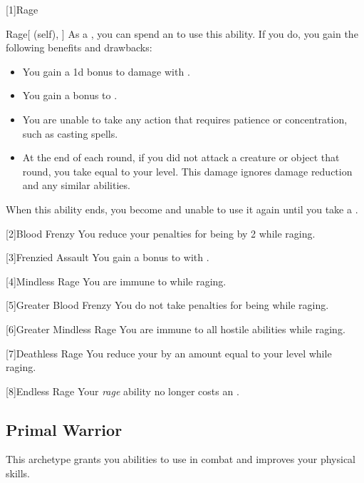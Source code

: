         [1]{Rage}
        \begin{ability}{Rage}[ (self), ]
            As a , you can spend an  to use this ability.
            If you do, you gain the following benefits and drawbacks:
            \begin{itemize}
                \item You gain a \plus1d bonus to damage with .
                \item You gain a  bonus to .
                \item You are unable to take any action that requires patience or concentration, such as casting spells.
                \item At the end of each round, if you did not attack a creature or object that round, you take  equal to your level.
                    This damage ignores damage reduction and any similar abilities.
            \end{itemize}
            When this ability ends, you become \fatigued and unable to use it again until you take a .
        \end{ability}

        [2]{Blood Frenzy}
        You reduce your penalties for being  by 2 while raging.

        [3]{Frenzied Assault}
        You gain a  bonus to  with .

        [4]{Mindless Rage}
        You are immune to   while raging.

        [5]{Greater Blood Frenzy} 
        You do not take penalties for being  while raging.

        [6]{Greater Mindless Rage} 
        You are immune to all hostile  abilities while raging.

        [7]{Deathless Rage} 
        You reduce your  by an amount equal to your level while raging.

        [8]{Endless Rage}
        Your \textit{rage} ability no longer costs an .

    \subsection{Primal Warrior}
        This archetype grants you abilities to use in combat and improves your physical skills.

